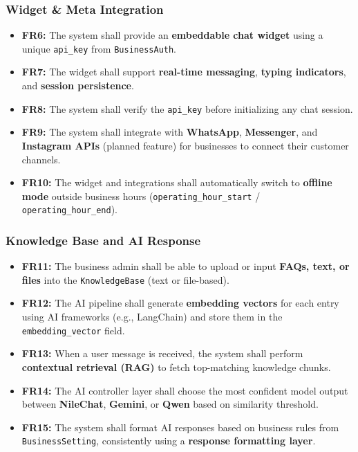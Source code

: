 \documentclass[12pt,a4paper]{article}
\begin{document}
\vspace{1em}
\noindent\hrulefill
\vspace{1em}

\subsubsection{Widget \& Meta Integration}
\begin{itemize}
    \item \textbf{FR6:} The system shall provide an \textbf{embeddable chat widget} using a unique \texttt{api\_key} from \texttt{BusinessAuth}.
    \item \textbf{FR7:} The widget shall support \textbf{real-time messaging}, \textbf{typing indicators}, and \textbf{session persistence}.
    \item \textbf{FR8:} The system shall verify the \texttt{api\_key} before initializing any chat session.
    \item \textbf{FR9:} The system shall integrate with \textbf{WhatsApp}, \textbf{Messenger}, and \textbf{Instagram APIs} (planned feature) for businesses to connect their customer channels.
    \item \textbf{FR10:} The widget and integrations shall automatically switch to \textbf{offline mode} outside business hours (\texttt{operating\_hour\_start} / \texttt{operating\_hour\_end}).
\end{itemize}

\vspace{1em}
\noindent\hrulefill
\vspace{1em}

\subsubsection{Knowledge Base and AI Response}
\begin{itemize}
    \item \textbf{FR11:} The business admin shall be able to upload or input \textbf{FAQs, text, or files} into the \texttt{KnowledgeBase} (text or file-based).
    \item \textbf{FR12:} The AI pipeline shall generate \textbf{embedding vectors} for each entry using AI frameworks (e.g., LangChain) and store them in the \texttt{embedding\_vector} field.
    \item \textbf{FR13:} When a user message is received, the system shall perform \textbf{contextual retrieval (RAG)} to fetch top-matching knowledge chunks.
    \item \textbf{FR14:} The AI controller layer shall choose the most confident model output between \textbf{NileChat}, \textbf{Gemini}, or \textbf{Qwen} based on similarity threshold.
    \item \textbf{FR15:} The system shall format AI responses based on business rules from \texttt{BusinessSetting}, consistently using a \textbf{response formatting layer}.
\end{itemize}
\end{document}
